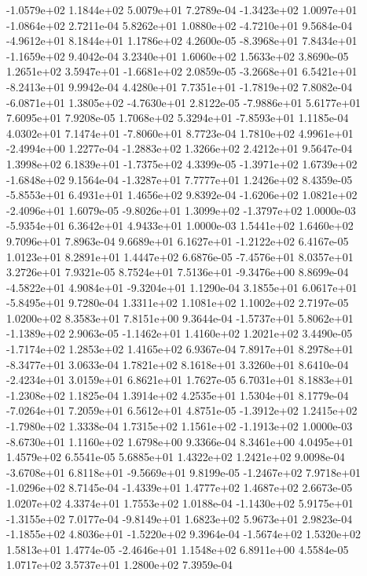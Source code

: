 -1.0579e+02  1.1844e+02  5.0079e+01  7.2789e-04
-1.3423e+02  1.0097e+01 -1.0864e+02  2.7211e-04
 5.8262e+01  1.0880e+02 -4.7210e+01  9.5684e-04
-4.9612e+01  8.1844e+01  1.1786e+02  4.2600e-05
-8.3968e+01  7.8434e+01 -1.1659e+02  9.4042e-04
3.2340e+01 1.6060e+02 1.5633e+02  3.8690e-05
 1.2651e+02  3.5947e+01 -1.6681e+02  2.0859e-05
-3.2668e+01  6.5421e+01 -8.2413e+01  9.9942e-04
 4.4280e+01  7.7351e+01 -1.7819e+02  7.8082e-04
-6.0871e+01  1.3805e+02 -4.7630e+01  2.8122e-05
-7.9886e+01  5.6177e+01  7.6095e+01  7.9208e-05
 1.7068e+02  5.3294e+01 -7.8593e+01  1.1185e-04
 4.0302e+01  7.1474e+01 -7.8060e+01  8.7723e-04
 1.7810e+02  4.9961e+01 -2.4994e+00  1.2277e-04
-1.2883e+02  1.3266e+02  2.4212e+01  9.5647e-04
 1.3998e+02  6.1839e+01 -1.7375e+02  4.3399e-05
-1.3971e+02  1.6739e+02 -1.6848e+02  9.1564e-04
-1.3287e+01  7.7777e+01  1.2426e+02  8.4359e-05
-5.8553e+01  6.4931e+01  1.4656e+02  9.8392e-04
-1.6206e+02  1.0821e+02 -2.4096e+01  1.6079e-05
-9.8026e+01  1.3099e+02 -1.3797e+02  1.0000e-03
-5.9354e+01  6.3642e+01  4.9433e+01  1.0000e-03
1.5441e+02 1.6460e+02 9.7096e+01  7.8963e-04
 9.6689e+01  6.1627e+01 -1.2122e+02  6.4167e-05
1.0123e+01 8.2891e+01 1.4447e+02  6.6876e-05
-7.4576e+01  8.0357e+01  3.2726e+01  7.9321e-05
 8.7524e+01  7.5136e+01 -9.3476e+00  8.8699e-04
-4.5822e+01  4.9084e+01 -9.3204e+01  1.1290e-04
 3.1855e+01  6.0617e+01 -5.8495e+01  9.7280e-04
1.3311e+02 1.1081e+02 1.1002e+02  2.7197e-05
1.0200e+02 8.3583e+01 7.8151e+00  9.3644e-04
-1.5737e+01  5.8062e+01 -1.1389e+02  2.9063e-05
-1.1462e+01  1.4160e+02  1.2021e+02  3.4490e-05
-1.7174e+02  1.2853e+02  1.4165e+02  6.9367e-04
 7.8917e+01  8.2978e+01 -8.3477e+01  3.0633e-04
1.7821e+02 8.1618e+01 3.3260e+01  8.6410e-04
-2.4234e+01  3.0159e+01  6.8621e+01  1.7627e-05
 6.7031e+01  8.1883e+01 -1.2308e+02  1.1825e-04
1.3914e+02 4.2535e+01 1.5304e+01  8.1779e-04
-7.0264e+01  7.2059e+01  6.5612e+01  4.8751e-05
-1.3912e+02  1.2415e+02 -1.7980e+02  1.3338e-04
 1.7315e+02  1.1561e+02 -1.1913e+02  1.0000e-03
-8.6730e+01  1.1160e+02  1.6798e+00  9.3366e-04
8.3461e+00 4.0495e+01 1.4579e+02  6.5541e-05
5.6885e+01 1.4322e+02 1.2421e+02  9.0098e-04
-3.6708e+01  6.8118e+01 -9.5669e+01  9.8199e-05
-1.2467e+02  7.9718e+01 -1.0296e+02  8.7145e-04
-1.4339e+01  1.4777e+02  1.4687e+02  2.6673e-05
1.0207e+02 4.3374e+01 1.7553e+02  1.0188e-04
-1.1430e+02  5.9175e+01 -1.3155e+02  7.0177e-04
-9.8149e+01  1.6823e+02  5.9673e+01  2.9823e-04
-1.1855e+02  4.8036e+01 -1.5220e+02  9.3964e-04
-1.5674e+02  1.5320e+02  1.5813e+01  1.4774e-05
-2.4646e+01  1.1548e+02  6.8911e+00  4.5584e-05
1.0717e+02 3.5737e+01 1.2800e+02  7.3959e-04
